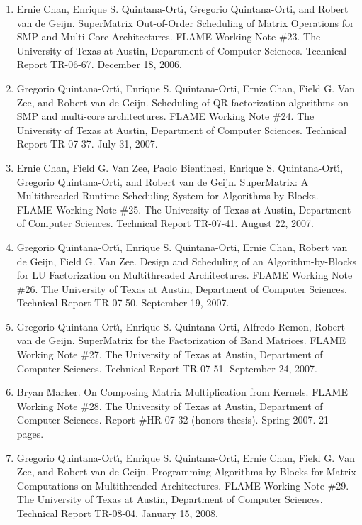 \begin{enumerate}
\item
      Ernie Chan, Enrique S. Quintana-Ort\'{\i}, Gregorio Quintana-Orti, and Robert van de Geijn. SuperMatrix Out-of-Order Scheduling of Matrix Operations for SMP and Multi-Core Architectures. FLAME Working Note \#23. The University of Texas at Austin, Department of Computer Sciences. Technical Report TR-06-67. December 18, 2006.

\item
      Gregorio Quintana-Ort\'{\i}, Enrique S. Quintana-Orti, Ernie Chan, Field G. Van Zee, and Robert van de Geijn. Scheduling of QR factorization algorithms on SMP and multi-core architectures. FLAME Working Note \#24. The University of Texas at Austin, Department of Computer Sciences. Technical Report TR-07-37. July 31, 2007.

\item
      Ernie Chan, Field G. Van Zee, Paolo Bientinesi, Enrique S. Quintana-Ort\'{\i}, Gregorio Quintana-Orti, and Robert van de Geijn. SuperMatrix: A Multithreaded Runtime Scheduling System for Algorithms-by-Blocks. FLAME Working Note \#25. The University of Texas at Austin, Department of Computer Sciences. Technical Report TR-07-41. August 22, 2007.

\item
      Gregorio Quintana-Ort\'{\i}, Enrique S. Quintana-Orti, Ernie Chan, Robert van de Geijn, Field G. Van Zee. Design and Scheduling of an Algorithm-by-Blocks for LU Factorization on Multithreaded Architectures. FLAME Working Note \#26. The University of Texas at Austin, Department of Computer Sciences. Technical Report TR-07-50. September 19, 2007.

\item
      Gregorio Quintana-Ort\'{\i}, Enrique S. Quintana-Orti, Alfredo Remon, Robert van de Geijn. SuperMatrix for the Factorization of Band Matrices. FLAME Working Note \#27. The University of Texas at Austin, Department of Computer Sciences. Technical Report TR-07-51. September 24, 2007.

\item
      Bryan Marker. On Composing Matrix Multiplication from Kernels. FLAME Working Note \#28. The University of Texas at Austin, Department of Computer Sciences. Report \#HR-07-32 (honors thesis). Spring 2007. 21 pages.

\item
      Gregorio Quintana-Ort\'{\i}, Enrique S. Quintana-Orti, Ernie Chan, Field G. Van Zee, and Robert van de Geijn. Programming Algorithms-by-Blocks for Matrix Computations on Multithreaded Architectures. FLAME Working Note \#29. The University of Texas at Austin, Department of Computer Sciences. Technical Report TR-08-04. January 15, 2008.


\end{enumerate}
